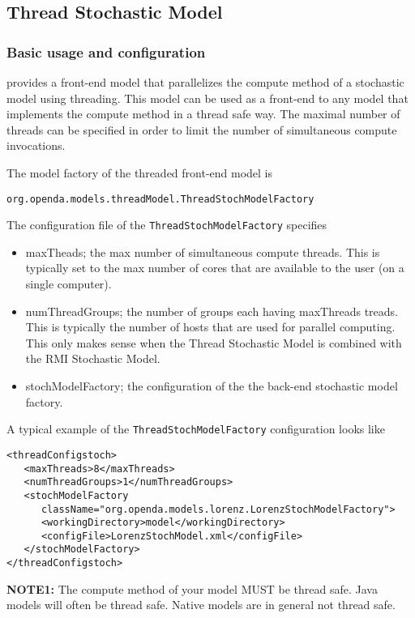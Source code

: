 \subsection{Thread Stochastic Model}
\subsubsection{Basic usage and configuration}
\oda provides a front-end model that parallelizes the compute method of a
stochastic model using threading. This model can be used as a front-end to any
\oda model that implements the compute method in a thread safe way. The maximal
number of threads can be specified in order to limit the number of simultaneous
compute invocations.

The model factory of the threaded front-end model is
\begin{verbatim}
org.openda.models.threadModel.ThreadStochModelFactory
\end{verbatim}

The configuration file of the {\tt ThreadStochModelFactory} specifies
\begin{itemize}
\item maxTheads; the max number of simultaneous compute threads. This is typically set to the
	max number of cores that are available to the user (on a single computer).
\item numThreadGroups; the number of groups each having maxThreads treads. This is typically the number of 
      hosts that are used for parallel computing. This only makes sense when the Thread Stochastic Model is combined
      with the RMI Stochastic Model.
\item stochModelFactory; the configuration of the the back-end stochastic model factory.
\end{itemize}

A typical example of the {\tt ThreadStochModelFactory} configuration looks like
{\small
\begin{verbatim}
<threadConfigstoch>
   <maxThreads>8</maxThreads>
   <numThreadGroups>1</numThreadGroups>
   <stochModelFactory
      className="org.openda.models.lorenz.LorenzStochModelFactory">
      <workingDirectory>model</workingDirectory>
      <configFile>LorenzStochModel.xml</configFile>
   </stochModelFactory>
</threadConfigstoch>
\end{verbatim}
}

{\bf NOTE1:} The compute method of your model MUST be thread safe. Java models
will often be thread safe. Native models are in general not thread safe.\\

